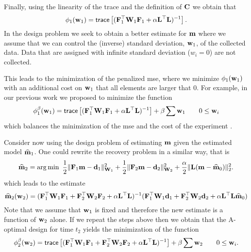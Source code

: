 \documentclass[leqno,onefignum,onetabnum]{siamltexmm}
\newcommand{\bfC}	{{\bf{C}}}
\newcommand{\bfF}	{{\bf{F}}}
\newcommand{\bfL}	{{\bf{L}}}
\newcommand{\bfW}	{{\bf{W}}}
\newcommand{\bfd}	{{\bf{d}}}
\newcommand{\bfm}	{{\bf{m}}}
\newcommand{\bfw}	{{\bf{w}}}
\newcommand{\hf}        {{\frac 12}}
\renewcommand{\hf}		 {\frac12}
\newcommand{\bfmhat}    {{\widehat{\bfm}}}
\newcommand{\LtL}       { \bfL^{\top}\bfL}
\begin{document}
Finally, using the linearity of the trace and the definition of $\bfC$ we obtain that
\begin{align}
\label{design1}
\phi_{1}(\bfw_1 ) =  {\sf trace} \left[   (\bfF_{1}^{\top}\bfW_{1}\bfF_{1}   + 
 {\alpha} \LtL)^{-1} \right]. 
\end{align}
In the design problem we seek to obtain a better estimate for $\bfm$ where we assume
that we can control the (inverse) standard deviation, $\bfw_{1}$, of the collected data.
Data that are assigned with infinite standard deviation ($w_i = 0$) are not collected.
 
 This leads to the minimization of the penalized mse, where 
we minimize $\phi_{1}(\bfw_{1})$ with an additional cost on $\bfw_{1}$ that all elements are larger that $0$.
 For example, in our
previous work we proposed to minimize the function
\begin{align}
\label{designp1}
\phi_{1}^{\beta}(\bfw_1 ) =  {\sf trace} \left[   (\bfF_{1}^{\top}\bfW_{1}\bfF_{1}   + 
 {\alpha} \LtL)^{-1} \right]  + \beta \sum \bfw_{1} \quad \quad 0 \le \bfw_i 
\end{align}
which balances the minimization of the mse and the cost of the experiment \cite{Haber2008}.

Consider now using the design problem of estimating $\bfm$ given the estimated model $\widehat \bfm_{1}$.
One could rewrite the recovery problem in a similar way,
that is
\begin{align}
\label{mest2}
\bfmhat_{2} = {\rm arg}\min\ \hf \| \bfF_{1} \bfm - \bfd_{1}\|^{2}_{\bfW_{1}} + \hf \| \bfF_{2} \bfm - \bfd_{2}\|^{2}_{\bfW_{2}}  + {\frac {\alpha} 2}
\|\bfL (\bfm -\bfmhat_{0}) \|^{2}_2. 
\end{align}
which leads to the estimate
\begin{align}
\label{mest2}
\bfmhat_{2}(\bfw_{2}) = (\bfF_{1}^{\top} \bfW_{1}\bfF_{1} +
\bfF_{2}^{\top} \bfW_{2}\bfF_{2} + \alpha \LtL)^{-1} (\bfF_{1}^{\top} \bfW_{1} \bfd_{1} +\bfF_{2}^{\top} \bfW_{2} \bfd_{2}
+ \alpha \LtL \bfmhat_{0})
\end{align}
Note that we assume that $\bfw_{1}$ is fixed and therefore the new estimate is a function of $\bfw_{2}$ alone.
If we repeat the steps above then we obtain that the A-optimal design for time $t_{2}$ yields the minimization of
the function
\begin{align}
\label{design2na}
\phi_{2}^{\beta}(\bfw_{2} ) =  {\sf trace} \left[   (\bfF_{1}^{\top}\bfW_{1}\bfF_{1}   + \bfF_{2}^{\top}\bfW_{2}\bfF_{2} +
\alpha \LtL)^{-1} \right] + \beta \sum \bfw_{2}\quad \quad 0 \le \bfw_i . 
\end{align}
\end{document}
